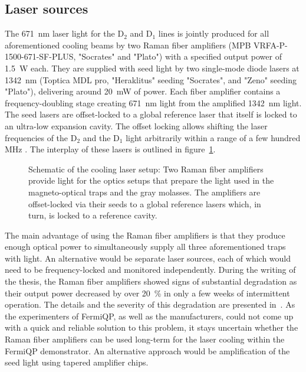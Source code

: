 \subsection*{Laser sources}
The \SI{671}{\nano\meter} laser light for the D$_2$ and D$_1$ lines is jointly produced for all aforementioned cooling beams by two Raman fiber amplifiers (MPB VRFA-P-1500-671-SF-PLUS, "Socrates" and "Plato") with a specified output power of \SI{1.5}{\watt} each. They are supplied with seed light by two single-mode diode lasers at \SI{1342}{\nano\meter} (Toptica MDL pro, "Heraklitus" seeding "Socrates", and "Zeno" seeding "Plato"), delivering around \SI{20}{\milli\watt} of power. Each fiber amplifier contains a frequency-doubling stage creating \SI{671}{\nano\meter} light from the amplified \SI{1342}{\nano\meter} light. The seed lasers are offset-locked to a global reference laser that itself is locked to an ultra-low expansion cavity. The offset locking allows shifting the laser frequencies of the D$_2$ and the D$_1$ light arbitrarily within a range of a few hundred \si{\mega\hertz} . The interplay of these lasers is outlined in figure~\ref{fig:laser_interplay_schematic}.

\begin{figure}
    \caption{Schematic of the cooling laser setup: Two Raman fiber amplifiers provide light for the optics setups that prepare the light used in the magneto-optical traps and the gray molasses. The amplifiers are offset-locked via their seeds to a global reference lasers which, in turn, is locked to a reference cavity.
    }\label{fig:laser_interplay_schematic}
\end{figure}


The main advantage of using the Raman fiber amplifiers is that they produce enough optical power to simultaneously supply all three aforementioned traps with light. An alternative would be separate laser sources, each of which would need to be frequency-locked and monitored independently. During the writing of the thesis, the Raman fiber amplifiers showed signs of substantial degradation as their output power decreased by over \SI{20}{\percent} in only a few weeks of intermittent operation. The details and the severity of this degradation are presented in~\cite{qesja_design_2022}. As the experimenters of FermiQP, as well as the manufacturers, could not come up with a quick and reliable solution to this problem, it stays uncertain whether the Raman fiber amplifiers can be used long-term for the laser cooling within the FermiQP demonstrator. An alternative approach would be amplification of the seed light using tapered amplifier chips.

